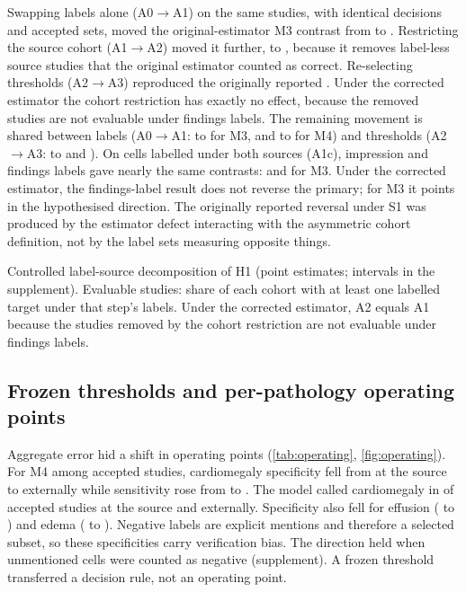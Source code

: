 Swapping labels alone (A0$\to$A1) on the same studies, with identical
decisions and accepted sets, moved the original-estimator M3 contrast from
\LSAZeroMThreeOrig{} to \LSAOneMThreeOrig{}. Restricting the source cohort
(A1$\to$A2) moved it further, to \LSATwoMThreeOrig{}, because it removes
label-less source studies that the original estimator counted as correct.
Re-selecting thresholds (A2$\to$A3) reproduced the originally reported
\LSAThreeMThreeOrig{}. Under the corrected estimator the cohort restriction has
exactly no effect, because the removed studies are not evaluable under findings
labels. The remaining movement is shared between labels (A0$\to$A1:
\LSAZeroMThreeEval{} to \LSAOneMThreeEval{} for M3, and \LSAZeroMFourEval{} to
\LSAOneMFourEval{} for M4) and thresholds (A2$\to$A3: to \LSAThreeMThreeEval{} and
\LSAThreeMFourEval{}). On cells labelled under both sources (A1c), impression and
findings labels gave nearly the same contrasts: \LSAOnecIMThreeEval{} and
\LSAOnecFMThreeEval{} for M3. Under the corrected estimator, the findings-label
result does not reverse the primary; for M3 it points in the hypothesised
direction. The originally reported reversal under S1 was produced by the estimator defect
interacting with the asymmetric cohort definition, not by the label sets
measuring opposite things.

\begin{table}[t]
\centering\scriptsize
\caption{Controlled label-source decomposition of H1 (point estimates; intervals
in the supplement). Evaluable studies: share of each cohort with at least one
labelled target under that step's labels. Under the corrected estimator, A2
equals A1 because the studies removed by the cohort restriction are not
evaluable under findings labels.}
\label{tab:ls}
\begin{adjustbox}{max width=\linewidth}

\end{adjustbox}
\end{table}

\subsection{Frozen thresholds and per-pathology operating points}
\label{sec:res-operating}
Aggregate error hid a shift in operating points (\cref{tab:operating},
\cref{fig:operating}). For M4 among accepted studies, cardiomegaly specificity
fell from \MFourCardSpecSrc{} at the source to \MFourCardSpecExt{} externally
while sensitivity rose from \MFourCardSensSrc{} to \MFourCardSensExt{}. The
model called cardiomegaly in \MFourCardPosSrc{} of accepted studies at the
source and \MFourCardPosExt{} externally. Specificity also fell for effusion
(\MFourEffSpecSrc{} to \MFourEffSpecExt{}) and edema (\MFourEdemaSpecSrc{} to
\MFourEdemaSpecExt{}). Negative labels are explicit mentions and therefore a
selected subset, so these specificities carry verification bias. The direction
held when unmentioned cells were counted as negative (supplement). A frozen
threshold transferred a decision rule, not an operating point.

